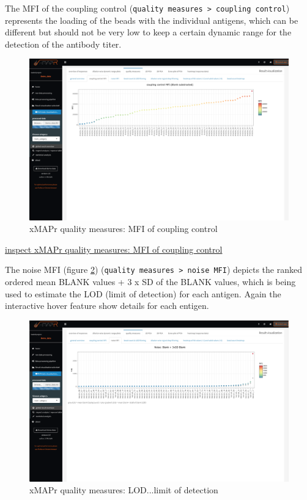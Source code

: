 \documentclass[
]{book}
\begin{document}
The MFI of the coupling control (\texttt{quality\ measures\ \textgreater{}\ coupling\ control}) represents the loading of the beads with the individual antigens, which can be different but should not be very low to keep a certain dynamic range for the detection of the antibody titer.

\begin{figure}
\includegraphics[width=50.47in]{figures/quality_measures__coupling_control_MFI} \caption{xMAPr quality measures: MFI of coupling control}\label{fig:MFIcouplingControl}
\end{figure}

\href{figures/quality_measures__coupling_control_MFI.png}{inspect xMAPr quality measures: MFI of coupling control}

The noise MFI (figure \ref{fig:LOD}) (\texttt{quality\ measures\ \textgreater{}\ noise\ MFI}) depicts the ranked ordered mean BLANK values + 3 x SD of the BLANK values, which is being used to estimate the LOD (limit of detection) for each antigen. Again the interactive hover feature show details for each entigen.

\begin{figure}
\includegraphics[width=50.53in]{figures/quality_measures__LOD} \caption{xMAPr quality measures: LOD...limit of detection}\label{fig:LOD}
\end{figure}
\end{document}
